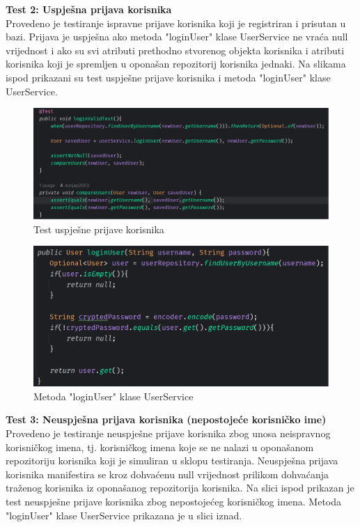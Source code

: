 \textbf{Test 2: Uspješna prijava korisnika} \\
Provedeno je testiranje ispravne prijave korisnika koji je registriran i prisutan u bazi. Prijava je uspješna ako metoda "loginUser" klase UserService ne vraća null vrijednost i ako su svi atributi prethodno stvorenog objekta korisnika i atributi korisnika koji je spremljen u oponašan repozitorij korisnika jednaki. Na slikama ispod prikazani su test uspješne prijave korisnika i metoda "loginUser" klase UserService.

				\begin{figure}[H]
			\includegraphics[scale=0.4]{slike/loginValidTest.PNG} %
			\centering
			\caption{Test uspješne prijave korisnika}
			\label{Test uspješne prijave korisnika}
		\end{figure}
		
						\begin{figure}[H]
			\includegraphics[scale=0.4]{slike/loginUser.PNG} %
			\centering
			\caption{Metoda "loginUser" klase UserService}
			\label{Metoda "loginUser" klase UserService}
		\end{figure}
		
\textbf{Test 3: Neuspješna prijava korisnika (nepostojeće korisničko ime)} \\
Provedeno je testiranje neuspješne prijave korisnika zbog unosa neispravnog korisničkog imena, tj. korisničkog imena koje se ne nalazi u oponašanom repozitoriju korisnika koji je simuliran u sklopu testiranja. Neuspješna prijava korisnika manifestira se kroz dohvaćenu null vrijednost prilikom dohvaćanja traženog korisnika iz oponašanog repozitorija korisnika. Na slici ispod prikazan je test neuspješne prijave korisnika zbog nepostojećeg korisničkog imena. Metoda "loginUser" klase UserService prikazana je u slici iznad.

